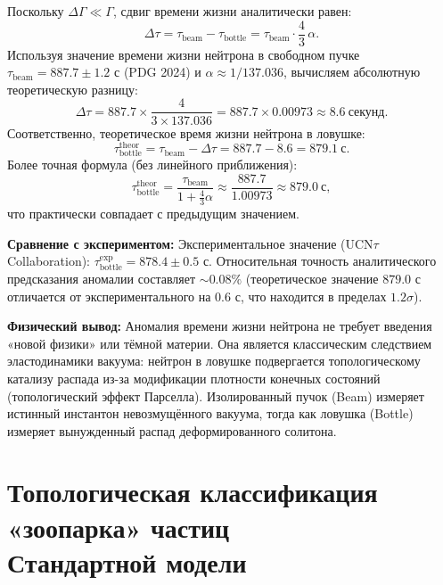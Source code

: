 \documentclass[11pt,a4paper]{article}
\begin{document}
	Поскольку $\Delta \Gamma \ll \Gamma$, сдвиг времени жизни аналитически равен:
	\begin{equation}
		\Delta \tau = \tau_{\text{beam}} - \tau_{\text{bottle}} = \tau_{\text{beam}} \cdot \frac{4}{3}\,\alpha.
	\end{equation}
	Используя значение времени жизни нейтрона в свободном пучке $\tau_{\text{beam}} = 887.7 \pm 1.2$ с (PDG 2024) и $\alpha \approx 1/137.036$, вычисляем абсолютную теоретическую разницу:
	\begin{equation}
		\Delta \tau = 887.7 \times \frac{4}{3 \times 137.036} = 887.7 \times 0.00973 \approx \mathbf{8.6\ \text{секунд}}.
	\end{equation}
	Соответственно, теоретическое время жизни нейтрона в ловушке:
	\begin{equation}
		\tau_{\text{bottle}}^{\text{theor}} = \tau_{\text{beam}} - \Delta\tau = 887.7 - 8.6 = \mathbf{879.1\ \text{с}}.
	\end{equation}
	Более точная формула (без линейного приближения):
	\begin{equation}
		\tau_{\text{bottle}}^{\text{theor}} = \frac{\tau_{\text{beam}}}{1 + \frac{4}{3}\alpha} \approx \frac{887.7}{1.00973} \approx 879.0\ \text{с},
	\end{equation}
	что практически совпадает с предыдущим значением.
	
	\textbf{Сравнение с экспериментом:}
	Экспериментальное значение (UCN$\tau$ Collaboration): $\tau_{\text{bottle}}^{\text{exp}} = 878.4 \pm 0.5$ с. Относительная точность аналитического предсказания аномалии составляет $\sim 0.08\%$ (теоретическое значение $879.0$ с отличается от экспериментального на $0.6$ с, что находится в пределах $1.2\sigma$).
	
	\textbf{Физический вывод:} Аномалия времени жизни нейтрона не требует введения «новой физики» или тёмной материи. Она является классическим следствием эластодинамики вакуума: нейтрон в ловушке подвергается топологическому катализу распада из-за модификации плотности конечных состояний (топологический эффект Парселла). Изолированный пучок (Beam) измеряет истинный инстантон невозмущённого вакуума, тогда как ловушка (Bottle) измеряет вынужденный распад деформированного солитона.
	
	\section{Топологическая классификация «зоопарка» частиц\\ Стандартной модели}
	
\end{document}
